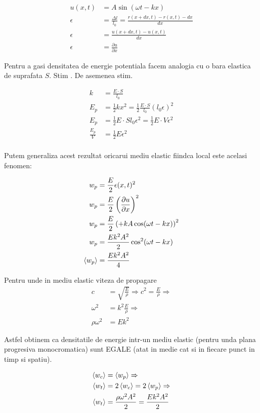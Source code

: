 \documentclass{article}
\begin{document}
\begin{align*}
    u(x, t) &= A\sin(\omega t - kx) \\
    \epsilon &= \frac{\Delta l}{l_0} = \frac{r(x+dx, t) - r(x, t)-dx}{dx} \\
    \epsilon &= \frac{u(x+dx, t) - u(x, t)}{dx} \\
    \epsilon &= \frac{\partial u}{\partial x}
\end{align*}

Pentru a gasi densitatea de energie potentiala facem analogia cu o bara elastica de suprafata $S$. Stim . De asemenea stim.

\begin{align*}
    k &= \frac{E\cdot S}{l_0} \\
    E_p &= \frac{1}{2} kx^2 = \frac{1}{2}\frac{E\cdot S}{l_0}\left(l_0\epsilon\right)^2 \\
    E_p &= \frac{1}{2}E\cdot Sl_0 \epsilon^2 = \frac{1}{2}E \cdot V \epsilon^2 \\
    \frac{E_p}{V} &= \frac{1}{2}E \epsilon^2 \\
\end{align*}

Putem generaliza acest rezultat oricarui mediu elastic fiindca local este acelasi fenomen:

\begin{align*}
    w_p &= \frac{E}{2}\epsilon(x, t)^2 \\
    w_p &= \frac{E}{2}\left(\frac{\partial u}{\partial x}\right)^2 \\
    w_p &= \frac{E}{2}\left(+kA\cos(\omega t - kx)\right)^2 \\
    w_p &= \frac{Ek^2A^2}{2}\cos^2(\omega t - kx) \\
    \braket{w_p} &= \frac{Ek^2A^2}{4}
\end{align*}

Pentru unde in mediu elastic viteza de propagare
\begin{align*}
    c &= \sqrt{\frac{E}{\rho}} \Rightarrow  c^2 = \frac{E}{\rho} \Rightarrow \\
    \omega^2&=k^2\frac{E}{\rho} \Rightarrow \\
    \rho\omega ^2 &= Ek^2
\end{align*}

Astfel obtinem ca densitatile de energie intr-un mediu elastic (pentru unda plana progresiva monocromatica) sunt EGALE (atat in medie cat si in fiecare punct in timp si spatiu).

\begin{align*}
    \braket{w_c} &= \braket{w_p} \Rightarrow \\
    \braket{w_t} &= 2\braket{w_c} = 2\braket{w_p} \Rightarrow \\
    \braket{w_t} &= \frac{\rho\omega^2 A^2}{2} = \frac{Ek^2A^2}{2}
\end{align*}
\end{document}
